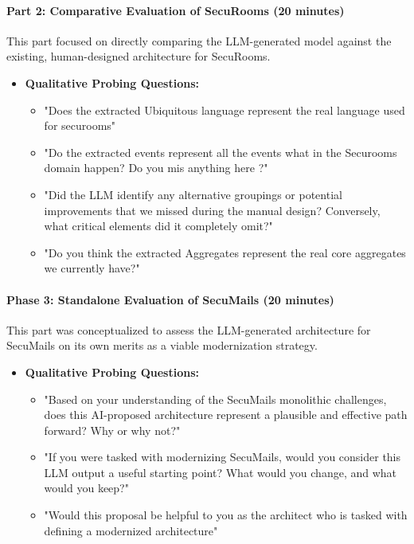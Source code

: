 \paragraph{Part 2: Comparative Evaluation of SecuRooms (20 minutes)}
This part focused on directly comparing the LLM-generated model against the existing, human-designed architecture for SecuRooms.

\begin{itemize}
    \item \textbf{Qualitative Probing Questions:}
    \begin{itemize}
        \item "Does the extracted Ubiquitous language represent the real language used for securooms"
        \item "Do the extracted events represent all the events what in the Securooms domain happen? Do you mis anything here ?"
        \item "Did the LLM identify any alternative groupings or potential improvements that we missed during the manual design? Conversely, what critical elements did it completely omit?"
        \item "Do you think the extracted Aggregates represent the real core aggregates we currently have?"
    \end{itemize}
\end{itemize}

\paragraph{Phase 3: Standalone Evaluation of SecuMails (20 minutes)}
This part was conceptualized to assess the LLM-generated architecture for SecuMails on its own merits as a viable modernization strategy.

\begin{itemize}
    \item \textbf{Qualitative Probing Questions:}
    \begin{itemize}
        \item "Based on your understanding of the SecuMails monolithic challenges, does this AI-proposed architecture represent a plausible and effective path forward? Why or why not?"
        \item "If you were tasked with modernizing SecuMails, would you consider this LLM output a useful starting point? What would you change, and what would you keep?"
        \item "Would this proposal be helpful to you as the architect who is tasked with defining a modernized architecture"
    \end{itemize}
\end{itemize}

